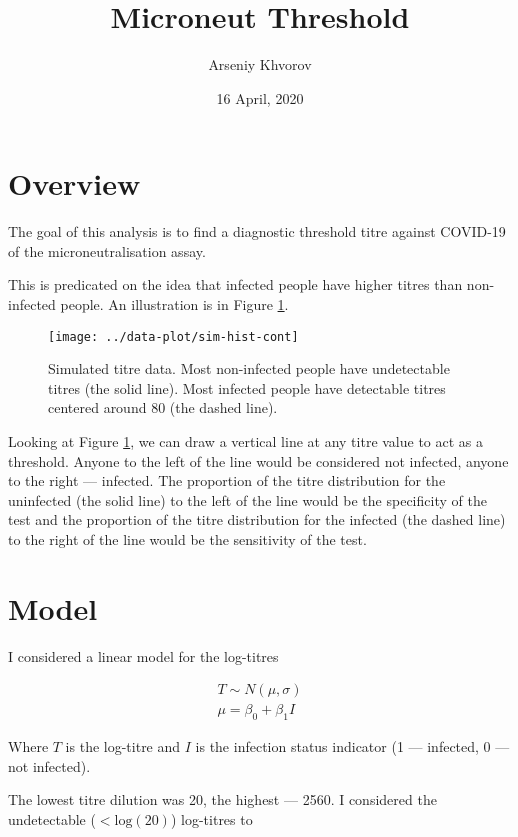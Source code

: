 \documentclass[]{article}
\title{Microneut Threshold}
\author{Arseniy Khvorov}
\date{16 April, 2020}
\begin{document}
\maketitle

\section{Overview}\label{overview}

The goal of this analysis is to find a diagnostic threshold titre
against COVID-19 of the microneutralisation assay.

This is predicated on the idea that infected people have higher titres
than non-infected people. An illustration is in Figure
\ref{fig:sim-hist-cont}.





\begin{figure}

{\centering \texttt{[image: ../data-plot/sim-hist-cont]} 

}

\caption{Simulated titre data. Most non-infected people have
undetectable titres (the solid line). Most infected people have
detectable titres centered around 80 (the dashed line).}\label{fig:sim-hist-cont}
\end{figure}

Looking at Figure \ref{fig:sim-hist-cont}, we can draw a vertical line
at any titre value to act as a threshold. Anyone to the left of the line
would be considered not infected, anyone to the right --- infected. The
proportion of the titre distribution for the uninfected (the solid line)
to the left of the line would be the specificity of the test and the
proportion of the titre distribution for the infected (the dashed line)
to the right of the line would be the sensitivity of the test.

\section{Model}\label{model}

I considered a linear model for the log-titres

\begin{gather*}
T \sim N(\mu, \sigma) \\
\mu = \beta_0 + \beta_1 I
\end{gather*}

Where \(T\) is the log-titre and \(I\) is the infection status indicator
(1 --- infected, 0 --- not infected).

The lowest titre dilution was 20, the highest --- 2560. I considered the
undetectable (\(<\text{log}(20)\)) log-titres to
\end{document}
